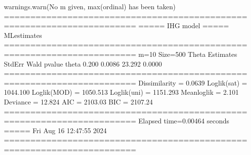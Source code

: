 \documentclass[letterpaper,10pt,english]{sphinxmanual}
\begin{document}
\begin{sphinxVerbatim}[commandchars=\\\{\}]
warnings.warn(\PYGZdq{}No m given, max(ordinal) has been taken\PYGZdq{})
=======================================================================
=====\PYGZgt{}\PYGZgt{}\PYGZgt{} IHG model \PYGZlt{}\PYGZlt{}\PYGZlt{}===== ML\PYGZhy{}estimates
=======================================================================
m=10  Size=500
\PYGZhy{}\PYGZhy{}\PYGZhy{}\PYGZhy{}\PYGZhy{}\PYGZhy{}\PYGZhy{}\PYGZhy{}\PYGZhy{}\PYGZhy{}\PYGZhy{}\PYGZhy{}\PYGZhy{}\PYGZhy{}\PYGZhy{}\PYGZhy{}\PYGZhy{}\PYGZhy{}\PYGZhy{}\PYGZhy{}\PYGZhy{}\PYGZhy{}\PYGZhy{}\PYGZhy{}\PYGZhy{}\PYGZhy{}\PYGZhy{}\PYGZhy{}\PYGZhy{}\PYGZhy{}\PYGZhy{}\PYGZhy{}\PYGZhy{}\PYGZhy{}\PYGZhy{}\PYGZhy{}\PYGZhy{}\PYGZhy{}\PYGZhy{}\PYGZhy{}\PYGZhy{}\PYGZhy{}\PYGZhy{}\PYGZhy{}\PYGZhy{}\PYGZhy{}\PYGZhy{}\PYGZhy{}\PYGZhy{}\PYGZhy{}\PYGZhy{}\PYGZhy{}\PYGZhy{}\PYGZhy{}\PYGZhy{}\PYGZhy{}\PYGZhy{}\PYGZhy{}\PYGZhy{}\PYGZhy{}\PYGZhy{}\PYGZhy{}\PYGZhy{}\PYGZhy{}\PYGZhy{}\PYGZhy{}\PYGZhy{}\PYGZhy{}\PYGZhy{}\PYGZhy{}\PYGZhy{}
Theta
       Estimates  StdErr    Wald  p\PYGZhy{}value
theta      0.200  0.0086  23.292   0.0000
=======================================================================
Dissimilarity = 0.0639
Loglik(sat)   = \PYGZhy{}1044.100
Loglik(MOD)   = \PYGZhy{}1050.513
Loglik(uni)   = \PYGZhy{}1151.293
Mean\PYGZhy{}loglik   = \PYGZhy{}2.101
Deviance      = 12.824
\PYGZhy{}\PYGZhy{}\PYGZhy{}\PYGZhy{}\PYGZhy{}\PYGZhy{}\PYGZhy{}\PYGZhy{}\PYGZhy{}\PYGZhy{}\PYGZhy{}\PYGZhy{}\PYGZhy{}\PYGZhy{}\PYGZhy{}\PYGZhy{}\PYGZhy{}\PYGZhy{}\PYGZhy{}\PYGZhy{}\PYGZhy{}\PYGZhy{}\PYGZhy{}\PYGZhy{}\PYGZhy{}\PYGZhy{}\PYGZhy{}\PYGZhy{}\PYGZhy{}\PYGZhy{}\PYGZhy{}\PYGZhy{}\PYGZhy{}\PYGZhy{}\PYGZhy{}\PYGZhy{}\PYGZhy{}\PYGZhy{}\PYGZhy{}\PYGZhy{}\PYGZhy{}\PYGZhy{}\PYGZhy{}\PYGZhy{}\PYGZhy{}\PYGZhy{}\PYGZhy{}\PYGZhy{}\PYGZhy{}\PYGZhy{}\PYGZhy{}\PYGZhy{}\PYGZhy{}\PYGZhy{}\PYGZhy{}\PYGZhy{}\PYGZhy{}\PYGZhy{}\PYGZhy{}\PYGZhy{}\PYGZhy{}\PYGZhy{}\PYGZhy{}\PYGZhy{}\PYGZhy{}\PYGZhy{}\PYGZhy{}\PYGZhy{}\PYGZhy{}\PYGZhy{}\PYGZhy{}
AIC = 2103.03
BIC = 2107.24
=======================================================================
Elapsed time=0.00464 seconds =====\PYGZgt{}\PYGZgt{}\PYGZgt{} Fri Aug 16 12:47:55 2024
=======================================================================
\end{sphinxVerbatim}

\noindent{}
\end{document}
